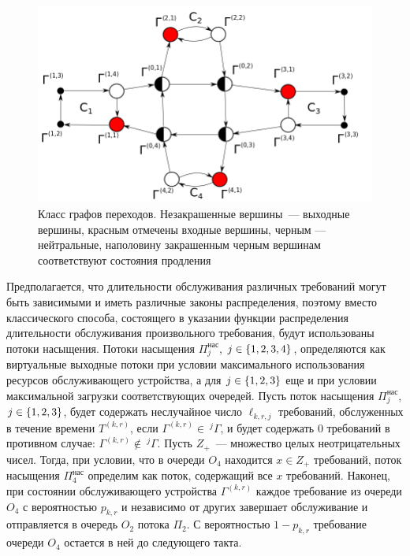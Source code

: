 \documentclass[a4paper,12pt,russian]{extarticle}
\newcommand{\G}{\Gamma}
\newcommand{\ga}[1]{\Gamma^{\left( #1 \right)} }
\newcommand{\Tt}[1]{T^{\left( #1 \right)} }
\begin{document}
\begin{figure}[hb]\centering
\includegraphics[scale=0.5]{GraphScheme3.png} 
\caption{Класс графов переходов. Незакрашенные вершины~--- выходные вершины, красным отмечены входные вершины, черным --- нейтральные, наполовину закрашенным черным вершинам соответствуют состояния продления}
\label{GraphScheme}
\end{figure}



Предполагается, что длительности обслуживания различных требований могут быть зависимыми и иметь различные законы распределения, поэтому вместо классического способа, состоящего в указании функции распределения длительности обслуживания произвольного требования, будут использованы потоки насыщения. Потоки насыщения $\Pi^{\mathrm{\text{нас}}}_j$, $j \in \left\{1,2,3,4\right\}$, определяются как виртуальные выходные потоки при 
условии максимального использования ресурсов обслуживающего устройства, а для $j\in \left\{1, 2, 3\right\}$ еще и при условии максимальной загрузки соответствующих очередей. 
Пусть поток насыщения $\Pi^{\mathrm{\text{нас}}}_j$, $j\in \left\{1,2,3\right\}$, будет содержать неслучайное число $\ell_{k,r,j}$ требований, обслуженных в течение времени $\Tt{k,r}$, если $\ga{k,r} \in~^j\G$, и будет содержать $0$ требований в противном случае: $\ga{k,r} \notin ~^j\G$. Пусть $Z_+$~--- множество целых неотрицательных чисел. Тогда, при условии, что в очереди $O_4$ находится $x \in Z_+$ требований, поток насыщения $\Pi^{\mathrm{\text{нас}}}_4$ определим как поток, содержащий все $x$ требований.
Наконец, при состоянии обслуживающего устройства $\ga{k,r}$ каждое требование из очереди $O_4$ с вероятностью $p_{k,r}$ и независимо от других завершает обслуживание и отправляется в очередь $O_2$ потока $\Pi_2$. С вероятностью $1-p_{k,r}$ требование очереди $O_4$ остается в ней до следующего такта.
\end{document}
